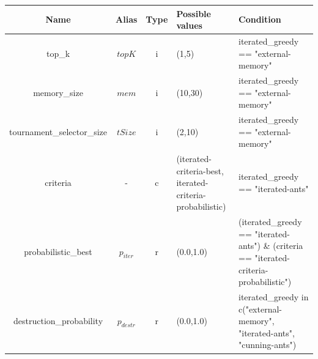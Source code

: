 \documentclass[11pt,a4paper,oneside]{book}
\begin{document}
\begin{table}[]
\centering
\begin{tabular}{|c|c|c|p{4cm}|p{4cm}|}
\hline
\textbf{Name}  & \textbf{Alias}      & \textbf{Type} & \textbf{Possible values}                                                                & \textbf{Condition}                                                                                     \\ \hline
top\_k                          & $topK$     & i    & (1,5)                                                                          & iterated\_greedy == "external-memory"                                                         \\ \hline
memory\_size                    & $mem$      & i    & (10,30)                                                                        & iterated\_greedy == "external-memory"                                                         \\ \hline
tournament\_selector\_size      & $tSize$    & i    & (2,10)                                                                         & iterated\_greedy == "external-memory"                                                         \\ \hline
criteria                        & -          & c    & (iterated-criteria-best, iterated-criteria-probabilistic)                       & iterated\_greedy	== "iterated-ants"                                                           \\ \hline
probabilistic\_best             & $p_{iter}$ & r    & (0.0,1.0)                                                                      & (iterated\_greedy == "iterated-ants") \& (criteria == "iterated-criteria-probabilistic")       \\ \hline
destruction\_probability        & $p_{destr}$  &  r & (0.0,1.0)                                                                      & iterated\_greedy in c("external-memory", "iterated-ants", "cunning-ants")                     \\ \hline
\end{tabular}
\end{table}
\end{document}
